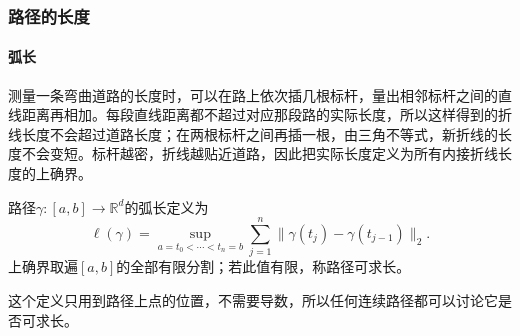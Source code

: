 \subsubsection{路径的长度}

\paragraph{弧长}

测量一条弯曲道路的长度时，可以在路上依次插几根标杆，量出相邻标杆之间的直线距离再相加。每段直线距离都不超过对应那段路的实际长度，所以这样得到的折线长度不会超过道路长度；在两根标杆之间再插一根，由三角不等式，新折线的长度不会变短。标杆越密，折线越贴近道路，因此把实际长度定义为所有内接折线长度的上确界。
\begin{definition}[路径的弧长]
路径$\gamma:[a,b]\to\mathbb R^d$的弧长定义为
\[
 \ell(\gamma)=\sup_{a=t_0<\cdots<t_n=b}
 \sum_{j=1}^n\lVert\gamma(t_j)-\gamma(t_{j-1})\rVert_2.
\]
上确界取遍$[a,b]$的全部有限分割；若此值有限，称路径可求长。
\end{definition}

这个定义只用到路径上点的位置，不需要导数，所以任何连续路径都可以讨论它是否可求长。


